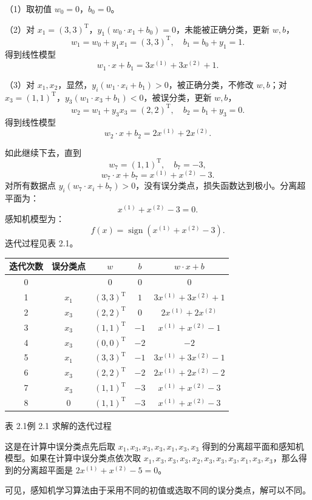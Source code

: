 \documentclass[UTF8, 12pt, fontset=fandol, oneside]{ctexart}
\begin{document}
（1）取初值 $w_0=0$，$b_0=0$。

（2）对 $x_1=(3,3)^\mathrm{T}$，$y_1(w_0\cdot x_1+b_0)=0$，未能被正确分类，更新 $w,b$，
\[
  w_1=w_0+y_1x_1=(3,3)^\mathrm{T},\quad b_1=b_0+y_1=1.
\]
得到线性模型
\[
  w_1\cdot x+b_1=3x^{(1)}+3x^{(2)}+1.
\]

（3）对 $x_1,x_2$，显然，$y_i(w_1\cdot x_i+b_1)>0$，被正确分类，不修改 $w,b$；对 $x_3=(1,1)^\mathrm{T}$，$y_3(w_1\cdot x_3+b_1)<0$，被误分类，更新 $w,b$，
\[
  w_2=w_1+y_3x_3=(2,2)^\mathrm{T},\quad b_2=b_1+y_3=0.
\]
得到线性模型
\[
  w_2\cdot x+b_2=2x^{(1)}+2x^{(2)}.
\]

如此继续下去，直到
\[
  w_7=(1,1)^\mathrm{T},\quad b_7=-3,
\]
\[
  w_7\cdot x+b_7=x^{(1)}+x^{(2)}-3.
\]
对所有数据点 $y_i(w_7\cdot x_i+b_7)>0$，没有误分类点，损失函数达到极小。分离超平面为：
\[
  x^{(1)}+x^{(2)}-3=0.
\]
感知机模型为：
\[
  f(x)=\operatorname{sign}(x^{(1)}+x^{(2)}-3).
\]
迭代过程见表 2.1。

\begin{center}
\begin{tabular}{c c c c c}
\hline
迭代次数 & 误分类点 & $w$ & $b$ & $w\cdot x+b$\\
\hline
0 &  & $0$ & $0$ & $0$\\
1 & $x_1$ & $(3,3)^\mathrm{T}$ & $1$ & $3x^{(1)}+3x^{(2)}+1$\\
2 & $x_3$ & $(2,2)^\mathrm{T}$ & $0$ & $2x^{(1)}+2x^{(2)}$\\
3 & $x_3$ & $(1,1)^\mathrm{T}$ & $-1$ & $x^{(1)}+x^{(2)}-1$\\
4 & $x_3$ & $(0,0)^\mathrm{T}$ & $-2$ & $-2$\\
5 & $x_1$ & $(3,3)^\mathrm{T}$ & $-1$ & $3x^{(1)}+3x^{(2)}-1$\\
6 & $x_3$ & $(2,2)^\mathrm{T}$ & $-2$ & $2x^{(1)}+2x^{(2)}-2$\\
7 & $x_3$ & $(1,1)^\mathrm{T}$ & $-3$ & $x^{(1)}+x^{(2)}-3$\\
8 & $0$ & $(1,1)^\mathrm{T}$ & $-3$ & $x^{(1)}+x^{(2)}-3$\\
\hline
\end{tabular}

表 2.1\quad 例 2.1 求解的迭代过程
\end{center}

这是在计算中误分类点先后取 $x_1,x_3,x_3,x_3,x_1,x_3,x_3$ 得到的分离超平面和感知机模型。如果在计算中误分类点依次取 $x_1,x_3,x_3,x_3,x_2,x_3,x_3,x_3,x_1,x_3,x_3$，那么得到的分离超平面是 $2x^{(1)}+x^{(2)}-5=0$。

可见，感知机学习算法由于采用不同的初值或选取不同的误分类点，解可以不同。
\end{document}
